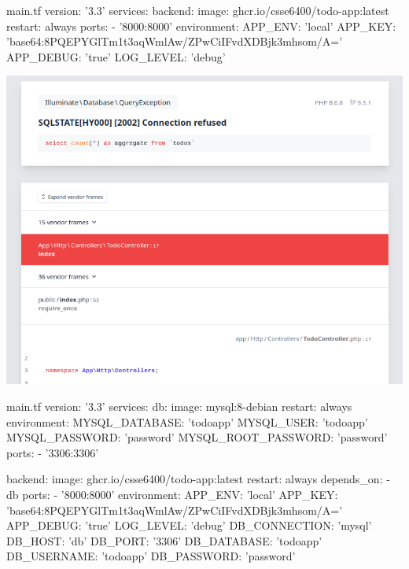 \documentclass{csse4400}
\begin{document}

\begin{code}[language=docker-compose]{main.tf}
version: '3.3'
services:
  backend:
    image: ghcr.io/csse6400/todo-app:latest
    restart: always
    ports:
      - '8000:8000'
    environment:
      APP_ENV: 'local'
      APP_KEY: 'base64:8PQEPYGlTm1t3aqWmlAw/ZPwCiIFvdXDBjk3mhsom/A='
      APP_DEBUG: 'true'
      LOG_LEVEL: 'debug'
\end{code}


\includegraphics[width=\textwidth]{images/missing-db}

\begin{code}[language=docker-compose]{main.tf}
version: '3.3'
services:
  db:
    image: mysql:8-debian
    restart: always
    environment:
      MYSQL_DATABASE: 'todoapp'
      MYSQL_USER: 'todoapp'
      MYSQL_PASSWORD: 'password'
      MYSQL_ROOT_PASSWORD: 'password'
    ports:
      - '3306:3306'

  backend:
    image: ghcr.io/csse6400/todo-app:latest
    restart: always
    depends_on:
      - db
    ports:
      - '8000:8000'
    environment:
      APP_ENV: 'local'
      APP_KEY: 'base64:8PQEPYGlTm1t3aqWmlAw/ZPwCiIFvdXDBjk3mhsom/A='
      APP_DEBUG: 'true'
      LOG_LEVEL: 'debug'
      DB_CONNECTION: 'mysql'
      DB_HOST: 'db'
      DB_PORT: '3306'
      DB_DATABASE: 'todoapp'
      DB_USERNAME: 'todoapp'
      DB_PASSWORD: 'password'
\end{code}
\end{document}
